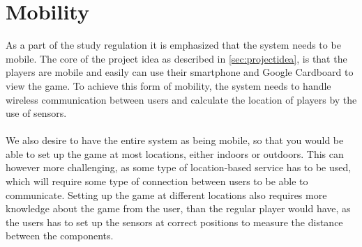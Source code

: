 \section{Mobility}\label{sec:mobility}
As a part of the study regulation it is emphasized that the system needs to be mobile.
The core of the project idea as described in \autoref{sec:projectidea}, is that the players are mobile and easily can use their smartphone and Google Cardboard to view the game.
To achieve this form of mobility, the system needs to handle wireless communication between users and calculate the location of players by the use of sensors.
\\\\
We also desire to have the entire system as being mobile, so that you would be able to set up the game at most locations, either indoors or outdoors.
This can however more challenging, as some type of location-based service has to be used, which will require some type of connection between users to be able to communicate.
Setting up the game at different locations also requires more knowledge about the game from the user, than the regular player would have, as the users has to set up the sensors at correct positions to measure the distance between the components.